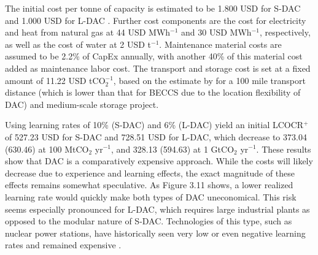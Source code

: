 The initial cost per tonne of capacity is estimated to be 1.800 USD for S-DAC and 1.000 USD for L-DAC \parencite{stolten_neue_2022}. Further cost components are the cost for electricity and heat from natural gas at 44 USD MWh$^{-1}$ and 30 USD MWh$^{-1}$, respectively, as well as the cost of water at 2 USD t$^{-1}$. Maintenance material costs are assumed to be 2.2\% of CapEx annually, with another 40\% of this material cost added as maintenance labor cost. The transport and storage cost is set at a fixed amount of 11.22 USD tCO$_2^{-1}$, based on the estimate by \textcite{smith_cost_2021} for a 100 mile transport distance (which is lower than that for BECCS due to the location flexibility of DAC) and medium-scale storage project. \vspace{2mm}

Using learning rates of 10\% (S-DAC) and 6\% (L-DAC) yield an initial LCOCR$^+$ of 527.23 USD for S-DAC and 728.51 USD for L-DAC, which decrease to 373.04 (630.46) at 100 MtCO$_2$ yr$^{-1}$, and 328.13 (594.63) at 1 GtCO$_2$ yr$^{-1}$. These results show that DAC is a comparatively expensive approach. While the costs will likely decrease due to experience and learning effects, the exact magnitude of these effects remains somewhat speculative. As Figure 3.11 shows, a lower realized learning rate would quickly make both types of DAC uneconomical. This risk seems especially pronounced for L-DAC, which requires large industrial plants as opposed to the modular nature of S-DAC. Technologies of this type, such as nuclear power stations, have historically seen very low or even negative learning rates and remained expensive \parencite{mcqueen_review_2021}.


